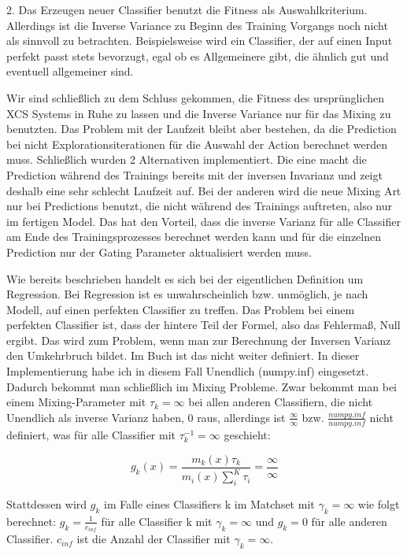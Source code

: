 \documentclass{ocsmnar}
\begin{document}
2. Das Erzeugen neuer Classifier benutzt die Fitness als Auswahlkriterium. Allerdings ist die Inverse Variance zu Beginn des Training Vorgangs noch nicht als sinnvoll zu betrachten. Beispielsweise wird ein Classifier, der auf einen Input perfekt passt stets bevorzugt, egal ob es Allgemeinere gibt, die ähnlich gut und eventuell allgemeiner sind.  

Wir sind schließlich zu dem Schluss gekommen, die Fitness des ursprünglichen XCS Systems in Ruhe zu lassen und die Inverse Variance nur für das Mixing zu benutzten. Das Problem mit der Laufzeit bleibt aber bestehen, da die Prediction bei nicht Explorationsiterationen für die Auswahl der Action berechnet werden muss. Schließlich wurden 2 Alternativen implementiert. Die eine macht die Prediction während des Trainings bereits mit der inversen Invarianz und zeigt deshalb eine sehr schlecht Laufzeit auf. Bei der anderen wird die neue Mixing Art nur bei Predictions benutzt, die nicht während des Trainings auftreten, also nur im fertigen Model. Das hat den Vorteil, dass die inverse Varianz für alle Classifier am Ende des Trainingsprozesses berechnet werden kann und für die einzelnen Prediction nur der Gating Parameter aktualisiert werden muss.  
 


Wie bereits beschrieben handelt es sich bei der eigentlichen Definition um Regression. Bei Regression ist es unwahrscheinlich bzw. unmöglich, je nach Modell, auf einen perfekten Classifier zu treffen. Das Problem bei einem perfekten Classifier ist, dass der hintere Teil der Formel, also das Fehlermaß, Null ergibt. Das wird zum Problem, wenn man zur Berechnung der Inversen Varianz den Umkehrbruch bildet. Im Buch ist das nicht weiter definiert. In dieser Implementierung habe ich in diesem Fall Unendlich (numpy.inf) eingesetzt. Dadurch bekommt man schließlich im Mixing Probleme. Zwar bekommt man bei einem Mixing-Parameter mit  $\tau_{k} =   \infty$ bei allen anderen Classifiern, die nicht Unendlich als inverse Varianz haben, 0 raus, allerdings ist $\frac{\infty}{\infty}$ bzw. $\frac{numpy.inf}{numpy.inf}$ nicht definiert, was für alle Classifier mit $\tau_{k}^{-1} = \infty$ geschieht:

$$ g_k(x) = \frac{m_k(x)\tau_k}{m_i(x)\sum_i^K \tau_i} = \frac{\infty}{\infty} $$

Stattdessen wird $g_{k}$ im Falle eines Classifiers k im Matchset mit $\gamma_{k} = \infty$ wie folgt berechnet: $g_{k} = \frac{1}{c_{inf}} $ für alle Classifier k mit $\gamma_{k} = \infty$ und $g_{k} = 0$ für alle anderen Classifier. $c_{inf}$ ist die Anzahl der Classifier mit $\gamma_{k} = \infty$.
\end{document}
